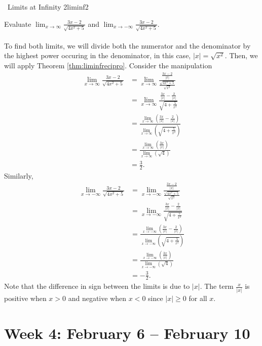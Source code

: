         \pagebreak
        \begin{example}{\Difficulty\,\Difficulty\,\,Limits at Infinity 2}{liminf2}
            
            Evaluate \(\lim_{x\to\infty}\frac{3x-2}{\sqrt{4x^2+5}}\) and \(\lim_{x\to-\infty}\frac{3x-2}{\sqrt{4x^2+5}}\).
            \\
            \\
            To find both limits, we will divide both the numerator and the denominator by the highest power occuring in the denominator, in this case, \(|x|=\sqrt{x^2}\). Then, we will apply Theorem \ref{thm:liminfrecipro}. Consider the manipulation
            \begin{align*}
                \lim_{x\to\infty}\frac{3x-2}{\sqrt{4x^2+5}}&=\lim_{x\to\infty}\frac{\frac{3x-2}{|x|}}{\frac{\sqrt{4x^2+5}}{\sqrt{x^2}}} \\
                &=\lim_{x\to\infty}\frac{\frac{3x}{|x|}-\frac{2}{|x|}}{\sqrt{4+\frac{5}{x^2}}} \\
                &=\frac{\lim\limits_{x\to\infty}\left(\frac{3x}{|x|}-\frac{2}{|x|}\right)}{\lim\limits_{x\to\infty}\left(\sqrt{4+\frac{5}{x^2}}\right)} \\
                &=\frac{\lim\limits_{x\to\infty}\left(\frac{3x}{|x|}\right)}{\lim\limits_{x\to\infty}\left(\sqrt{4}\right)} \\
                &=\frac{3}{2}.
            \end{align*}
            Similarly,
            \begin{align*}
                \lim_{x\to-\infty}\frac{3x-2}{\sqrt{4x^2+5}}&=\lim_{x\to-\infty}\frac{\frac{3x-2}{|x|}}{\frac{\sqrt{4x^2+5}}{\sqrt{x^2}}} \\
                &=\lim_{x\to-\infty}\frac{\frac{3x}{|x|}-\frac{2}{|x|}}{\sqrt{4+\frac{5}{x^2}}} \\
                &=\frac{\lim\limits_{x\to-\infty}\left(\frac{3x}{|x|}-\frac{2}{|x|}\right)}{\lim\limits_{x\to-\infty}\left(\sqrt{4+\frac{5}{x^2}}\right)} \\
                &=\frac{\lim\limits_{x\to-\infty}\left(\frac{3x}{|x|}\right)}{\lim\limits_{x\to-\infty}\left(\sqrt{4}\right)} \\
                &=-\frac{3}{2}.
            \end{align*}
            Note that the difference in sign between the limits is due to \(|x|\). The term \(\frac{x}{|x|}\) is positive when \(x>0\) and negative when \(x<0\) since \(|x|\geq0\) for all \(x\).
        \end{example}

\pagebreak

\section{Week 4: February 6 -- February 10}